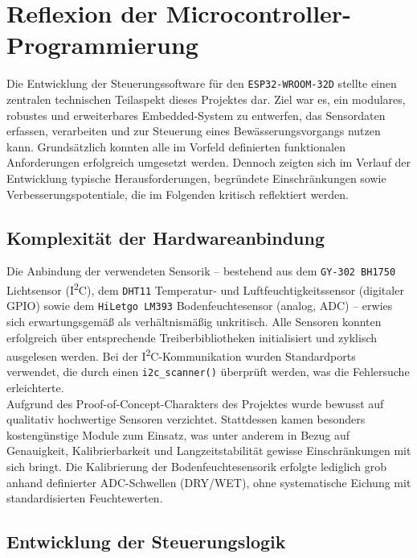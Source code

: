 \section{Reflexion der Microcontroller-Programmierung}

Die Entwicklung der Steuerungssoftware für den \texttt{ESP32-WROOM-32D} stellte einen zentralen technischen Teilaspekt dieses Projektes dar. Ziel war es, ein modulares, robustes und erweiterbares Embedded-System zu entwerfen, das Sensordaten erfassen, verarbeiten und zur Steuerung eines Bewässerungsvorgangs nutzen kann. Grundsätzlich konnten alle im Vorfeld definierten funktionalen Anforderungen erfolgreich umgesetzt werden. Dennoch zeigten sich im Verlauf der Entwicklung typische Herausforderungen, begründete Einschränkungen sowie Verbesserungspotentiale, die im Folgenden kritisch reflektiert werden.

\subsection{Komplexität der Hardwareanbindung}

Die Anbindung der verwendeten Sensorik – bestehend aus dem \texttt{GY-302 BH1750} Lichtsensor (I\textsuperscript{2}C), dem \texttt{DHT11} Temperatur- und Luftfeuchtigkeitssensor (digitaler GPIO) sowie dem \texttt{HiLetgo LM393} Bodenfeuchtesensor (analog, ADC) – erwies sich erwartungsgemäß als verhältnismäßig unkritisch. Alle Sensoren konnten erfolgreich über entsprechende Treiberbibliotheken initialisiert und zyklisch ausgelesen werden. Bei der I\textsuperscript{2}C-Kommunikation wurden Standardports verwendet, die durch einen \texttt{i2c\_scanner()} überprüft werden, was die Fehlersuche erleichterte. 
\\
Aufgrund des Proof-of-Concept-Charakters des Projektes wurde bewusst auf qualitativ hochwertige Sensoren verzichtet. Stattdessen kamen besonders kostengünstige Module zum Einsatz, was unter anderem in Bezug auf Genauigkeit, Kalibrierbarkeit und Langzeitstabilität gewisse Einschränkungen mit sich bringt. Die Kalibrierung der Bodenfeuchtesensorik erfolgte lediglich grob anhand definierter ADC-Schwellen (DRY/WET), ohne systematische Eichung mit standardisierten Feuchtewerten.

\subsection{Entwicklung der Steuerungslogik}

